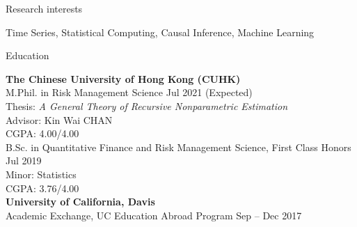 \documentclass[10pt]{resume} %
\begin{document}

\begin{rSection}{Research interests}

Time Series, Statistical Computing, Causal Inference, Machine Learning

\end{rSection}


\begin{rSection}{Education}

{\bf The Chinese University of Hong Kong (CUHK)} \\
M.Phil. in Risk Management Science \hfill {Jul 2021 (Expected)} \\
\hspace*{1em} Thesis: \textit{A General Theory of Recursive Nonparametric Estimation} \\
\hspace*{1em} Advisor: Kin Wai CHAN \\
\hspace*{1em} CGPA: 4.00/4.00 \smallskip \\
B.Sc. in Quantitative Finance and Risk Management Science, First Class Honors \hfill {Jul 2019} \\
\hspace*{1em} Minor: Statistics \\
\hspace*{1em} CGPA: 3.76/4.00 \smallskip \\
{\bf University of California, Davis} \\
Academic Exchange, UC Education Abroad Program  \hfill {Sep -- Dec 2017}

\end{rSection}

\end{document}
